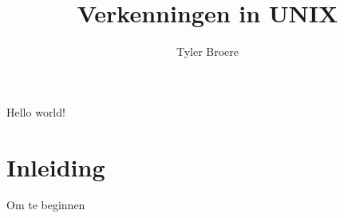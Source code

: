 \documentclass{article}
\begin{document}
\title{Verkenningen in  UNIX} 
\author{Tyler Broere}
\maketitle
Hello world!

\section{Inleiding}
Om te beginnen
\end{document}
